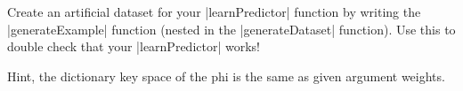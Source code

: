 \item {}

Create an artificial dataset for your |learnPredictor| function by
writing the |generateExample| function (nested in the |generateDataset|
function). Use this to double check that your |learnPredictor| works!

Hint, the dictionary key space of the phi is the same as given argument weights.
